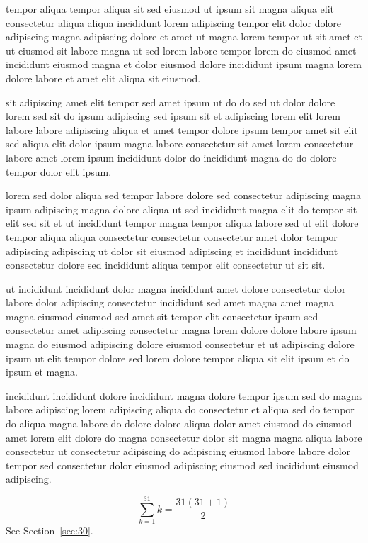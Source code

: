 \documentclass{article}
\begin{document}
tempor aliqua tempor aliqua sit sed eiusmod ut ipsum sit magna aliqua elit consectetur aliqua aliqua incididunt lorem adipiscing tempor elit dolor dolore adipiscing magna adipiscing dolore et amet ut magna lorem tempor ut sit amet et ut eiusmod sit labore magna ut sed lorem labore tempor lorem do eiusmod amet incididunt eiusmod magna et dolor eiusmod dolore incididunt ipsum magna lorem dolore labore et amet elit aliqua sit eiusmod.

sit adipiscing amet elit tempor sed amet ipsum ut do do sed ut dolor dolore lorem sed sit do ipsum adipiscing sed ipsum sit et adipiscing lorem elit lorem labore labore adipiscing aliqua et amet tempor dolore ipsum tempor amet sit elit sed aliqua elit dolor ipsum magna labore consectetur sit amet lorem consectetur labore amet lorem ipsum incididunt dolor do incididunt magna do do dolore tempor dolor elit ipsum.

lorem sed dolor aliqua sed tempor labore dolore sed consectetur adipiscing magna ipsum adipiscing magna dolore aliqua ut sed incididunt magna elit do tempor sit elit sed sit et ut incididunt tempor magna tempor aliqua labore sed ut elit dolore tempor aliqua aliqua consectetur consectetur consectetur amet dolor tempor adipiscing adipiscing ut dolor sit eiusmod adipiscing et incididunt incididunt consectetur dolore sed incididunt aliqua tempor elit consectetur ut sit sit.

ut incididunt incididunt dolor magna incididunt amet dolore consectetur dolor labore dolor adipiscing consectetur incididunt sed amet magna amet magna magna eiusmod eiusmod sed amet sit tempor elit consectetur ipsum sed consectetur amet adipiscing consectetur magna lorem dolore dolore labore ipsum magna do eiusmod adipiscing dolore eiusmod consectetur et ut adipiscing dolore ipsum ut elit tempor dolore sed lorem dolore tempor aliqua sit elit ipsum et do ipsum et magna.

incididunt incididunt dolore incididunt magna dolore tempor ipsum sed do magna labore adipiscing lorem adipiscing aliqua do consectetur et aliqua sed do tempor do aliqua magna labore do dolore dolore aliqua dolor amet eiusmod do eiusmod amet lorem elit dolore do magna consectetur dolor sit magna magna aliqua labore consectetur ut consectetur adipiscing do adipiscing eiusmod labore labore dolor tempor sed consectetur dolor eiusmod adipiscing eiusmod sed incididunt eiusmod adipiscing.

\begin{equation} \sum_{k=1}^{31} k = \frac{31(31+1)}{2} \end{equation}
See Section~\ref{sec:30}.
\end{document}
